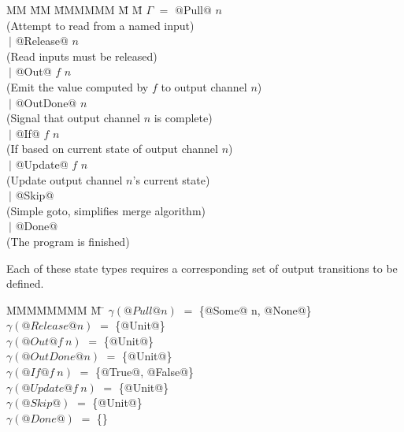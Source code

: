 \begin{tabbing}
MM \= MM \= MMMMMM \= M \= M \kill
$\Gamma$ \> $=$ \> @Pull@     \>     \> $n$         \\
         \>     \> (Attempt to read from a named input) \\

         \> $~|$\> @Release@  \>     \> $n$         \\
         \>     \> (Read inputs must be released) \\

         \> $~|$\> @Out@      \> $f$ \> $n$         \\
         \>     \> (Emit the value computed by $f$ to output channel $n$) \\

         \> $~|$\> @OutDone@  \>     \> $n$         \\
         \>     \> (Signal that output channel $n$ is complete) \\

         \> $~|$\> @If@       \> $f$ \> $n$         \\
         \>     \> (If based on current state of output channel $n$) \\

         \> $~|$\> @Update@   \> $f$ \> $n$         \\
         \>     \> (Update output channel $n$'s current state) \\

         \> $~|$\> @Skip@     \>                    \\
         \>     \> (Simple goto, simplifies merge algorithm) \\

         \> $~|$\> @Done@     \>                    \\
         \>     \> (The program is finished) \\
\end{tabbing}

Each of these state types requires a corresponding set of output transitions to be defined.
\begin{tabbing}
MMMMMMMM \= M \= \kill
$\gamma(@Pull @n)$
                            \> $=$ \> \{@Some@ n, @None@\} \\
$\gamma(@Release @n)$
                            \> $=$ \> \{@Unit@\} \\
$\gamma(@Out @   f~n)$
                            \> $=$ \> \{@Unit@\} \\
$\gamma(@OutDone @ n)$
                            \> $=$ \> \{@Unit@\} \\
$\gamma(@If @    f~n)$
                            \> $=$ \> \{@True@, @False@\} \\
$\gamma(@Update @f~n)$
                            \> $=$ \> \{@Unit@\} \\
$\gamma(@Skip@      )$
                            \> $=$ \> \{@Unit@\} \\
$\gamma(@Done@      )$
                            \> $=$ \> \{\} \\
\end{tabbing}

